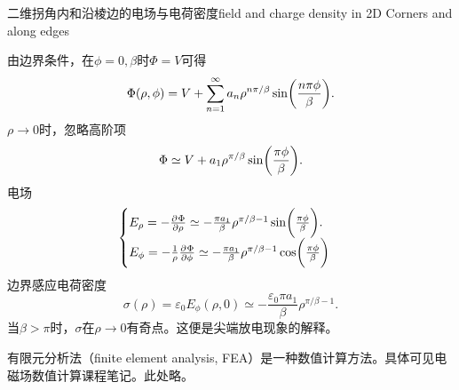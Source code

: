 \begin{example}{二维拐角内和沿棱边的电场与电荷密度}{field and charge density in 2D Corners and along edges}
    \begin{center}
    \end{center}
    由边界条件，在$\phi=0,\beta$时$\Phi=V$可得
    \begin{equation}
        \Phi(\rho,\phi)=V+\sum_{n=1}^\infty a_n\rho^{n\pi/\beta}\sin\biggl(\frac{n\pi\phi}\beta\biggr).
    \end{equation}
    $\rho\to0$时，忽略高阶项
    \[
        \Phi\simeq V+a_1\rho^{\pi/\beta}\sin\biggl(\frac{\pi\phi}\beta\biggr).
    \]
    电场 
    \begin{equation}
        \begin{cases}
            E_\rho=-\frac{\partial^{{}}\Phi}{\partial{\rho}^{{}}}\simeq-\frac{\pi a_1}\beta\rho^{\pi/\beta-1}\sin\biggl(\frac{\pi\phi}\beta\biggr).\\
            E_\phi=-\frac1\rho\frac{\partial^{{}}\Phi}{\partial{\phi}^{{}}}\simeq-\frac{\pi a_1}\beta\rho^{\pi/\beta-1}\cos\biggl(\frac{\pi\phi}\beta\biggr)
        \end{cases}
    \end{equation}
    边界感应电荷密度
    \begin{equation}
        \sigma(\rho)=\varepsilon_0E_\phi(\rho,0)\simeq-\frac{\varepsilon_0\pi a_1}\beta\rho^{\pi/\beta-1}.
    \end{equation}
    当$\beta>\pi$时，$\sigma$在$\rho\to0$有奇点。这便是尖端放电现象的解释。
\end{example}

\label{sec:finite element analysis}

有限元分析法（finite element analysis, FEA）是一种数值计算方法。具体可见电磁场数值计算课程笔记。此处略。


